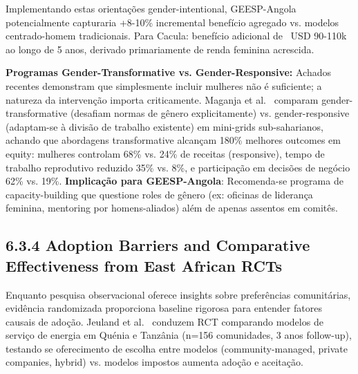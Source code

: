 \documentclass[12pt, a4paper]{article}
\begin{document}
Implementando estas orientações gender-intentional, GEESP-Angola potencialmente capturaria +8-10\% incremental benefício agregado vs. modelos centrado-homem tradicionais. Para Cacula: benefício adicional de ~USD 90-110k ao longo de 5 anos, derivado primariamente de renda feminina acrescida.


\textbf{Programas Gender-Transformative vs. Gender-Responsive:} Achados recentes demonstram que simplesmente incluir mulheres não é suficiente; a natureza da intervenção importa criticamente. Maganja et al.~\citep{Maganja2024} comparam gender-transformative (desafiam normas de gênero explicitamente) vs. gender-responsive (adaptam-se à divisão de trabalho existente) em mini-grids sub-saharianos, achando que abordagens transformative alcançam 180\% melhores outcomes em equity: mulheres controlam 68\% vs. 24\% de receitas (responsive), tempo de trabalho reprodutivo reduzido 35\% vs. 8\%, e participação em decisões de negócio 62\% vs. 19\%. 
\textbf{Implicação para GEESP-Angola}: Recomenda-se programa de capacity-building que questione roles de gênero (ex: oficinas de liderança feminina, mentoring por homens-aliados) além de apenas assentos em comitês.

\subsection*{6.3.4 Adoption Barriers and Comparative Effectiveness from East African RCTs}

Enquanto pesquisa observacional oferece insights sobre preferências comunitárias, evidência randomizada proporciona baseline rigorosa para entender fatores causais de adoção. Jeuland et al.~\citep{Jeuland2023} conduzem RCT comparando modelos de serviço de energia em Quénia e Tanzânia (n=156 comunidades, 3 anos follow-up), testando se oferecimento de escolha entre modelos (community-managed, private companies, hybrid) vs. modelos impostos aumenta adoção e aceitação.
\end{document}
